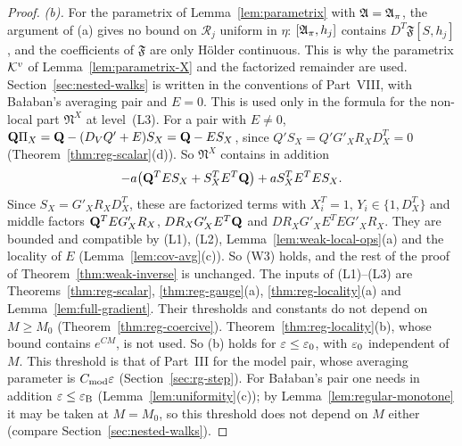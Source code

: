 \begin{proof}
\emph{(b).} For the parametrix of Lemma~\ref{lem:parametrix} with $\mathfrak A=\mathfrak A_\pi$, the argument of (a) gives no bound on $\mathcal R_j$ uniform in $\eta$: $[\mathfrak A_\pi,h_j]$ contains $D^T\mathfrak F[S,h_j]$, and the coefficients of $\mathfrak F$ are only H\"older continuous. This is why the parametrix $\mathcal K^v$ of Lemma~\ref{lem:parametrix-X} and the factorized remainder are used. Section~\ref{sec:nested-walks} is written in the conventions of Part~VIII, with Ba\l aban's averaging pair and $E=0$. This is used only in the formula for the non-local part $\mathfrak N^X$ at level~(L3). For a pair with $E\ne0$, $\mathbf Q\Pi_X=\mathbf Q-(D_VQ'+E)S_X=\mathbf Q-ES_X$, since $Q'S_X=Q'G'_XR_XD^T_X=0$ (Theorem~\ref{thm:reg-scalar}(d)). So $\mathfrak N^X$ contains in addition
\[
-a\big(\mathbf Q^TES_X+S_X^TE^T\mathbf Q\big)+aS_X^TE^TES_X .
\]
Since $S_X=G'_XR_XD^T_X$, these are factorized terms with $X_i^T=1$, $Y_i\in\{1,D^T_X\}$ and middle factors $\mathbf Q^TEG'_XR_X$, $DR_XG'_XE^T\mathbf Q$ and $DR_XG'_XE^TEG'_XR_X$. They are bounded and compatible by (L1), (L2), Lemma~\ref{lem:weak-local-ops}(a) and the locality of $E$ (Lemma~\ref{lem:cov-avg}(c)). So (W3) holds, and the rest of the proof of Theorem~\ref{thm:weak-inverse} is unchanged. The inputs of (L1)--(L3) are Theorems~\ref{thm:reg-scalar}, \ref{thm:reg-gauge}(a), \ref{thm:reg-locality}(a) and Lemma~\ref{lem:full-gradient}. Their thresholds and constants do not depend on $M\ge M_0$ (Theorem~\ref{thm:reg-coercive}). Theorem~\ref{thm:reg-locality}(b), whose bound contains $e^{CM}$, is not used. So (b) holds for $\varepsilon\le\varepsilon_0$, with $\varepsilon_0$ independent of $M$. This threshold is that of Part~III for the model pair, whose averaging parameter is $C_{\rm mod}\varepsilon$ (Section~\ref{sec:rg-step}). For Ba\l aban's pair one needs in addition $\varepsilon\le\varepsilon_{\rm B}$ (Lemma~\ref{lem:uniformity}(c)); by Lemma~\ref{lem:regular-monotone} it may be taken at $M=M_0$, so this threshold does not depend on $M$ either (compare Section~\ref{sec:nested-walks}).
\end{proof}

